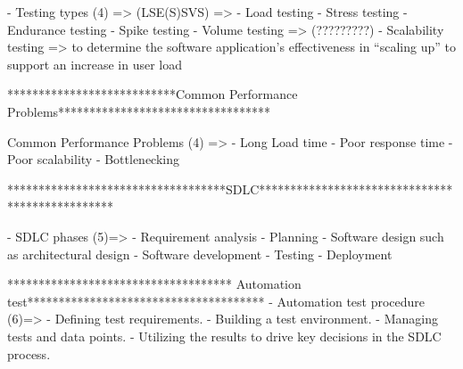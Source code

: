     - Testing types (4) => (LSE(S)SVS) =>
        - Load testing 
        - Stress testing 
        - Endurance testing  
        - Spike testing
        - Volume testing => (?????????)
        - Scalability testing => to determine the software application's effectiveness in “scaling up” to support an increase in user load 


***************************Common Performance Problems**********************************

Common Performance Problems (4) =>
    - Long Load time
    - Poor response time
    - Poor scalability 
    - Bottlenecking 



 ***********************************SDLC************************************************

- SDLC phases (5)=>
    - Requirement analysis
    - Planning
    - Software design such as architectural design
    - Software development
    - Testing
    - Deployment

************************************ Automation test**************************************
- Automation test procedure (6)=>
    - Defining test requirements.
    - Building a test environment.
    - Managing tests and data points.
    - Utilizing the results to drive key decisions in the SDLC process.